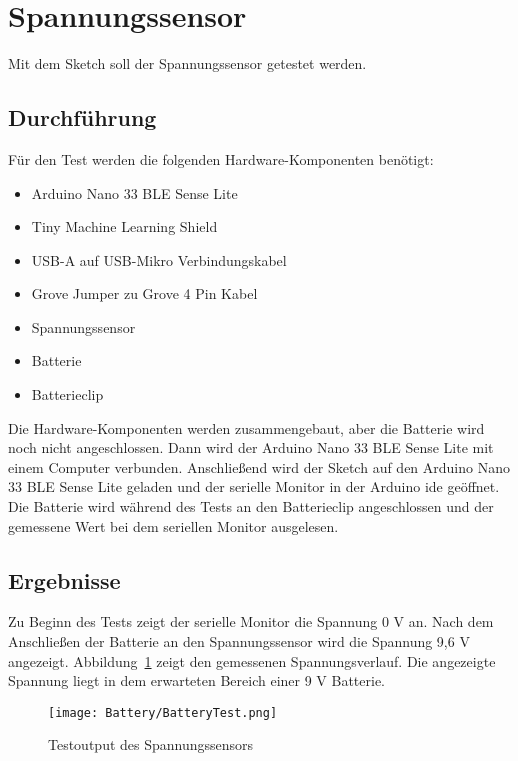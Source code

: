 \section{Spannungssensor}
Mit dem Sketch  soll der Spannungssensor getestet werden.

\begin{code}[h]
\end{code}

\subsection{Durchführung}

Für den Test werden die folgenden Hardware-Komponenten benötigt:

\begin{itemize}
    \item Arduino Nano 33 BLE Sense Lite
    \item Tiny Machine Learning Shield
    \item USB-A auf USB-Mikro Verbindungskabel
    \item Grove Jumper zu Grove 4 Pin Kabel
    \item Spannungssensor
    \item Batterie
    \item Batterieclip
\end{itemize}

Die Hardware-Komponenten werden  zusammengebaut, aber die Batterie wird noch nicht angeschlossen. Dann wird der Arduino Nano 33 BLE Sense Lite mit einem Computer verbunden. Anschließend wird der Sketch  auf den Arduino Nano 33 BLE Sense Lite geladen und der serielle Monitor in der Arduino \acs{ide} geöffnet. Die Batterie wird während des Tests an den Batterieclip angeschlossen und der gemessene Wert bei dem seriellen Monitor ausgelesen.

\subsection{Ergebnisse}

Zu Beginn des Tests zeigt der serielle Monitor die Spannung 0 V an. Nach dem Anschließen der Batterie an den Spannungssensor wird die Spannung 9,6 V angezeigt.  Abbildung~\ref{BildSpannungTest} zeigt den gemessenen Spannungsverlauf. Die angezeigte Spannung liegt in dem erwarteten Bereich einer 9 V Batterie.

\begin{figure}[h]
    \begin{center}
        \texttt{[image: Battery/BatteryTest.png]}
        \caption{Testoutput des Spannungssensors}
        \label{BildSpannungTest}
    \end{center}
\end{figure}

